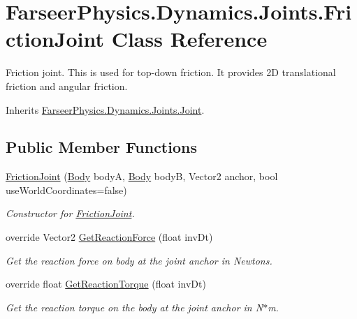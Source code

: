 \hypertarget{class_farseer_physics_1_1_dynamics_1_1_joints_1_1_friction_joint}{\section{Farseer\+Physics.\+Dynamics.\+Joints.\+Friction\+Joint Class Reference}
\label{class_farseer_physics_1_1_dynamics_1_1_joints_1_1_friction_joint}
}


Friction joint. This is used for top-\/down friction. It provides 2\+D translational friction and angular friction.  




Inherits \hyperlink{class_farseer_physics_1_1_dynamics_1_1_joints_1_1_joint}{Farseer\+Physics.\+Dynamics.\+Joints.\+Joint}.

\subsection*{Public Member Functions}
\begin{DoxyCompactItemize}
\item 
\hyperlink{class_farseer_physics_1_1_dynamics_1_1_joints_1_1_friction_joint_a5eda748f9057f4695809bae0510d6db4}{Friction\+Joint} (\hyperlink{class_farseer_physics_1_1_dynamics_1_1_body}{Body} body\+A, \hyperlink{class_farseer_physics_1_1_dynamics_1_1_body}{Body} body\+B, Vector2 anchor, bool use\+World\+Coordinates=false)
\begin{DoxyCompactList}\small\item\em Constructor for \hyperlink{class_farseer_physics_1_1_dynamics_1_1_joints_1_1_friction_joint}{Friction\+Joint}. \end{DoxyCompactList}\item 
override Vector2 \hyperlink{class_farseer_physics_1_1_dynamics_1_1_joints_1_1_friction_joint_a7f34a26cc99f146fe09066056f5b45b9}{Get\+Reaction\+Force} (float inv\+Dt)
\begin{DoxyCompactList}\small\item\em Get the reaction force on body at the joint anchor in Newtons. \end{DoxyCompactList}\item 
override float \hyperlink{class_farseer_physics_1_1_dynamics_1_1_joints_1_1_friction_joint_a6f468ec9c8a256b6d24d2b913216323e}{Get\+Reaction\+Torque} (float inv\+Dt)
\begin{DoxyCompactList}\small\item\em Get the reaction torque on the body at the joint anchor in N$\ast$m. \end{DoxyCompactList}\end{DoxyCompactItemize}
